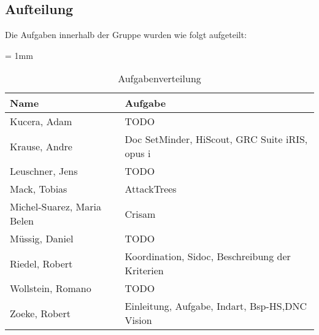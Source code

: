 \subsection{Aufteilung}
Die Aufgaben innerhalb der Gruppe wurden wie folgt aufgeteilt:

\begin{table}[H]
	\sffamily
	\caption{Aufgabenverteilung}
	\tabulinesep = 1mm %
	\centering
		\begin{tabu} to 0.9\textwidth { X[1.5]  X[3] }
		\hline
		\textbf{Name} & \textbf{Aufgabe}\\
		\hline 
		Kucera, Adam & TODO\\

		Krause, Andre & Doc SetMinder, HiScout, GRC Suite iRIS, opus i\\

		Leuschner, Jens & TODO\\

		Mack, Tobias & AttackTrees\\

		Michel-Suarez, Maria Belen & Crisam\\

		Müssig, Daniel & TODO\\

		Riedel, Robert & Koordination, Sidoc, Beschreibung der Kriterien\\

		Wollstein, Romano & TODO\\

		Zoeke, Robert & Einleitung, Aufgabe, Indart, Bsp-HS,DNC Vision\\

	\end{tabu}
\end{table}
